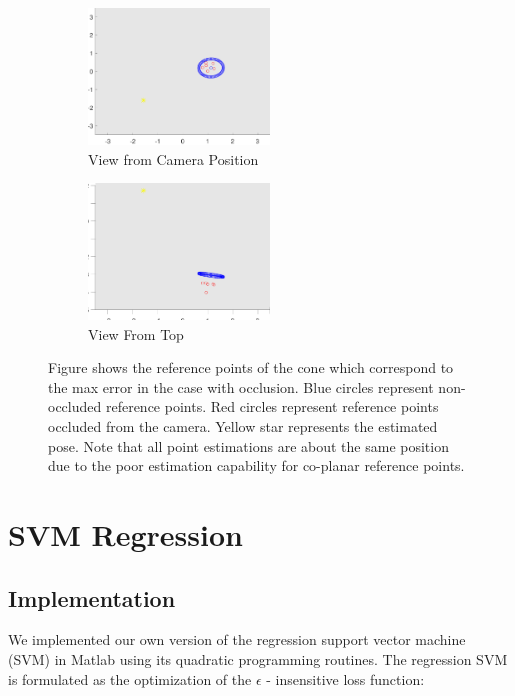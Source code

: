 \documentclass[journal]{IEEEtran}
\begin{document}
\begin{figure}
	\hspace{-10 ex}
	\begin{subfigure}{.3\textwidth}
		\centering
		\includegraphics[width=1.9in]{poor_cone_camera_view_w_error}
		\caption{View from Camera Position}
		\label{fig:vive}
	\end{subfigure}%
	\begin{subfigure}{.3\textwidth}
		\centering
		\includegraphics[width=1.9in]{poor_cone_topview_view_w_error}
		\caption{View From Top}
		\label{fig:oculus}
	\end{subfigure}
	\caption{Figure shows the reference points of the cone which correspond to the max error in the case with occlusion. Blue circles represent non-occluded reference points. Red circles represent reference points occluded from the camera. Yellow star represents the estimated pose. Note that all point estimations are about the same position due to the poor estimation capability for co-planar reference points.}
	\label{Fig:cone_performance}
\end{figure}


\section{SVM Regression}

\subsection{Implementation}
We implemented our own version of the regression support vector machine (SVM) in Matlab using its quadratic programming routines. The regression SVM is formulated as the optimization of the $\epsilon$ - insensitive loss function:
\end{document}
